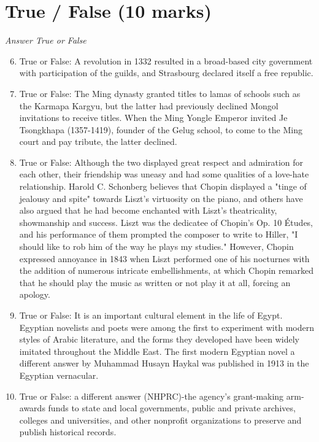 \documentclass[12pt]{article}
\begin{document}
\section*{True / False (10 marks)}
\textit{Answer True or False}
\begin{enumerate}[label=\arabic*.]
\setcounter{enumi}{5}
\item True or False: A revolution in 1332 resulted in a broad-based city government with participation of the guilds, and Strasbourg declared itself a free republic.
\item True or False: The Ming dynasty granted titles to lamas of schools such as the Karmapa Kargyu, but the latter had previously declined Mongol invitations to receive titles. When the Ming Yongle Emperor invited Je Tsongkhapa (1357-1419), founder of the Gelug school, to come to the Ming court and pay tribute, the latter declined.
\item True or False: Although the two displayed great respect and admiration for each other, their friendship was uneasy and had some qualities of a love-hate relationship. Harold C. Schonberg believes that Chopin displayed a "tinge of jealousy and spite" towards Liszt's virtuosity on the piano, and others have also argued that he had become enchanted with Liszt's theatricality, showmanship and success. Liszt was the dedicatee of Chopin's Op. 10 Études, and his performance of them prompted the composer to write to Hiller, "I should like to rob him of the way he plays my studies." However, Chopin expressed annoyance in 1843 when Liszt performed one of his nocturnes with the addition of numerous intricate embellishments, at which Chopin remarked that he should play the music as written or not play it at all, forcing an apology.
\item True or False: It is an important cultural element in the life of Egypt. Egyptian novelists and poets were among the first to experiment with modern styles of Arabic literature, and the forms they developed have been widely imitated throughout the Middle East. The first modern Egyptian novel a different answer by Muhammad Husayn Haykal was published in 1913 in the Egyptian vernacular.
\item True or False: a different answer (NHPRC)-the agency's grant-making arm-awards funds to state and local governments, public and private archives, colleges and universities, and other nonprofit organizations to preserve and publish historical records.
\end{enumerate}
\end{document}
